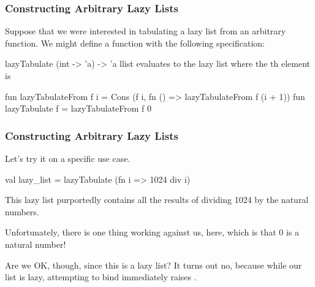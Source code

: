 \documentclass[aspectratio=169, handout]{beamer}
\begin{document}
\begin{frame}[fragile]
  \frametitle{Constructing Arbitrary Lazy Lists}

  Suppose that we were interested in tabulating a lazy list from an
  arbitrary function. We might define a function  with the
  following specification:

  \pause
  \spec
    {lazyTabulate}
    {(int -> 'a) -> 'a llist}
    {}
    { evaluates to the lazy list where the th
    element is }

  \pause
  \vspace{\fill}

  \begin{codeblock}
    fun lazyTabulateFrom f i =
      Cons (f i, fn () => lazyTabulateFrom f (i + 1))
    fun lazyTabulate f = lazyTabulateFrom f 0
  \end{codeblock}
\end{frame}

\begin{frame}[fragile]
  \frametitle{Constructing Arbitrary Lazy Lists}

  Let's try it on a specific use case.

  \pause
  \vspace{\fill}

  \begin{codeblock}
    val lazy_list = lazyTabulate (fn i => 1024 div i)
  \end{codeblock}

  \pause
  \vspace{\fill}

  This lazy list purportedly contains all the results of dividing
  1024 by the natural numbers.

  \vspace{\fill}

  Unfortunately, there is one thing working against us, here, which is
  that 0 is a natural number!

  \pause
  \vspace{\fill}

  Are we OK, though, since this is a lazy list? It turns out no, because
  while our list is lazy, attempting to bind  immediately
  raises .
\end{frame}
\end{document}
